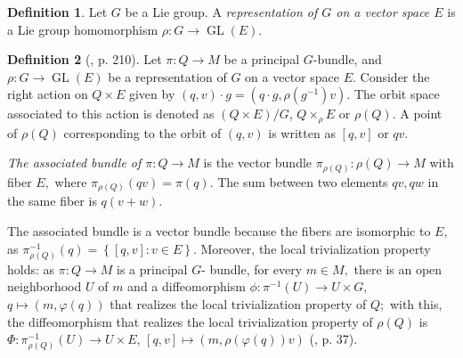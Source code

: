 \documentclass[12pt, letterpaper, reqno]{amsart}
\theoremstyle{definition}
\newtheorem{df}{Definition}
\theoremstyle{plain}
\theoremstyle{remark}
\begin{document}
\begin{df}
	Let $ G $ be a Lie group. A \textit{representation of $ G $ on a vector space $ E $} is a Lie group homomorphism $ \rho: G \rightarrow \operatorname{GL} (E). $ 
\end{df}

\begin{df}[\cite{montgomery2002tour}, p. 210]
	Let $ \pi: Q \rightarrow M $ be a principal $ G $-bundle, and $ \rho: G \rightarrow \operatorname{GL}(E) $ be a representation of $ G $ on a vector space $ E. $ Consider the right action on $ Q\times E $ given by $ (q,v)\cdot g = (q\cdot g, \rho(g^{-1})v). $  The orbit space associated to this action is denoted as $ (Q\times E)/G $, $ Q\times_\rho E $ or $ \rho(Q). $  A point of $ \rho(Q) $ corresponding to the orbit of $ (q,v) $ is written as $ [q,v] $ or $ qv. $  

	\textit{The associated bundle of $ \pi:Q \rightarrow M $ } is the vector bundle $ \pi_{ \rho(Q)}: \rho(Q) \rightarrow M $ with fiber $ E, $ where $ \pi_{\rho(Q)}(qv)=\pi(q). $ The sum between two elements $ qv,qw$ in the same fiber is $ q(v+w). $  
\end{df}

The associated bundle is a vector bundle because the fibers are isomorphic to $ E, $ as $ \pi_{\rho(Q)}^{-1}(q)= \left\{ [q,v]: v\in E \right\}.  $ Moreover, the local trivialization property holds: as $ \pi: Q \rightarrow M $ is a principal $ G $- bundle, for every $ m\in M, $ there is an open neighborhood $ U $ of $ m $ and a diffeomorphism $ \phi: \pi^{-1}(U) \rightarrow U \times G, $ $ q \mapsto (m, \varphi(q)) $ that realizes the local trivialization property of $ Q; $ with this, the diffeomorphism that realizes the local trivialization property of $ \rho(Q) $ is $ \Phi: \pi_{\rho(Q)}^{-1}(U) \rightarrow U\times E $, $ [q,v] \mapsto (m, \rho(\varphi(q))v) $ (\cite{sharpe2000differential}, p. 37).  
\end{document}
